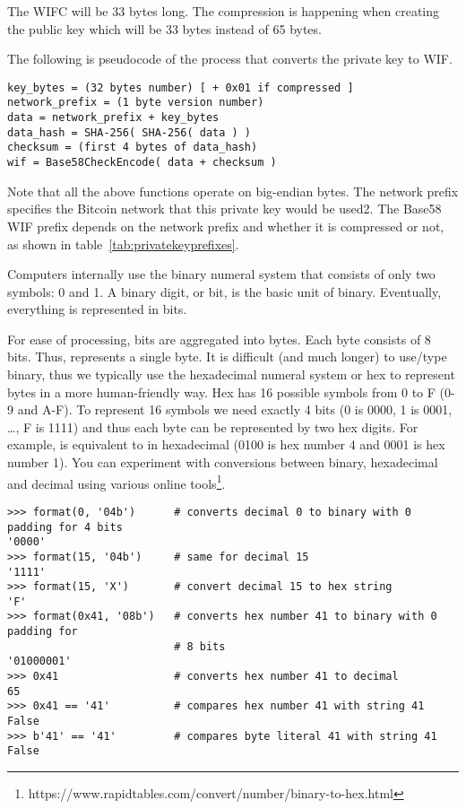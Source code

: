 \begin{note}
The WIFC will be 33 bytes long. The compression is happening when creating the public key which will be 33 bytes instead of 65 bytes.
\end{note}

The following is pseudocode of the process that converts the private key to WIF.

\begin{emphbox}
\begin{lstlisting}[style=Pseudomath]
key_bytes = (32 bytes number) [ + 0x01 if compressed ]
network_prefix = (1 byte version number)
data = network_prefix + key_bytes
data_hash = SHA-256( SHA-256( data ) )
checksum = (first 4 bytes of data_hash)
wif = Base58CheckEncode( data + checksum )
\end{lstlisting}
\end{emphbox}

Note that all the above functions operate on big-endian bytes. The network prefix specifies the Bitcoin network that this private key would be used2. The Base58 WIF prefix depends on the network prefix and whether it is compressed or not, as shown in table~\ref{tab:privatekeyprefixes}.







Computers internally use the binary numeral system that consists of only two symbols: 0 and 1. A binary digit, or bit, is the basic unit of binary. Eventually, everything is represented in bits.

For ease of processing, bits are aggregated into bytes. Each byte consists of 8 bits. Thus,  represents a single byte. It is difficult (and much longer) to use/type binary, thus we typically use the hexadecimal numeral system or hex to represent bytes in a more human-friendly way. Hex has 16 possible symbols from 0 to F (0-9 and A-F). To represent 16 symbols we need exactly 4 bits (0 is 0000, 1 is 0001, …, F is 1111) and thus each byte can be represented by two hex digits. For example,  is equivalent to  in hexadecimal (0100 is hex number 4 and 0001 is hex number 1). You can experiment with conversions between binary, hexadecimal and decimal using various online tools\footnote{https://www.rapidtables.com/convert/number/binary-to-hex.html}.

\vspace{1em}
\begin{lstlisting}[style=Python,label={lst:encodings-1},caption={Python examples},captionpos=b]
>>> format(0, '04b')      # converts decimal 0 to binary with 0 padding for 4 bits
'0000'
>>> format(15, '04b')     # same for decimal 15
'1111'
>>> format(15, 'X')       # convert decimal 15 to hex string
'F'
>>> format(0x41, '08b')   # converts hex number 41 to binary with 0 padding for
                          # 8 bits
'01000001'
>>> 0x41                  # converts hex number 41 to decimal
65
>>> 0x41 == '41'          # compares hex number 41 with string 41
False
>>> b'41' == '41'         # compares byte literal 41 with string 41
False
\end{lstlisting}
\vspace{1em}

